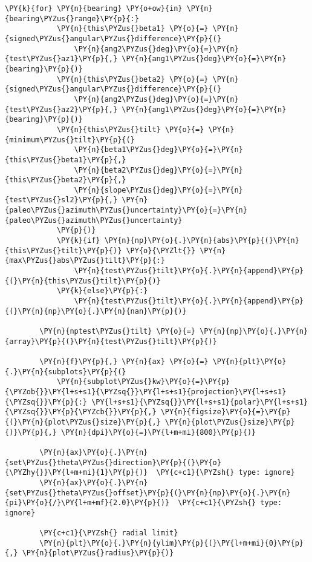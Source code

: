 \begin{tcolorbox}[breakable, size=fbox, boxrule=1pt, pad at break*=1mm,colback=cellbackground, colframe=cellborder]
\begin{Verbatim}[commandchars=\\\{\}]
        \PY{k}{for} \PY{n}{bearing} \PY{o+ow}{in} \PY{n}{bearing\PYZus{}range}\PY{p}{:}
            \PY{n}{this\PYZus{}beta1} \PY{o}{=} \PY{n}{signed\PYZus{}angular\PYZus{}difference}\PY{p}{(}
                \PY{n}{ang2\PYZus{}deg}\PY{o}{=}\PY{n}{test\PYZus{}az1}\PY{p}{,} \PY{n}{ang1\PYZus{}deg}\PY{o}{=}\PY{n}{bearing}\PY{p}{)}
            \PY{n}{this\PYZus{}beta2} \PY{o}{=} \PY{n}{signed\PYZus{}angular\PYZus{}difference}\PY{p}{(}
                \PY{n}{ang2\PYZus{}deg}\PY{o}{=}\PY{n}{test\PYZus{}az2}\PY{p}{,} \PY{n}{ang1\PYZus{}deg}\PY{o}{=}\PY{n}{bearing}\PY{p}{)}
            \PY{n}{this\PYZus{}tilt} \PY{o}{=} \PY{n}{minimum\PYZus{}tilt}\PY{p}{(}
                \PY{n}{beta1\PYZus{}deg}\PY{o}{=}\PY{n}{this\PYZus{}beta1}\PY{p}{,}
                \PY{n}{beta2\PYZus{}deg}\PY{o}{=}\PY{n}{this\PYZus{}beta2}\PY{p}{,}
                \PY{n}{slope\PYZus{}deg}\PY{o}{=}\PY{n}{test\PYZus{}sl2}\PY{p}{,} \PY{n}{paleo\PYZus{}azimuth\PYZus{}uncertainty}\PY{o}{=}\PY{n}{paleo\PYZus{}azimuth\PYZus{}uncertainty}
            \PY{p}{)}
            \PY{k}{if} \PY{n}{np}\PY{o}{.}\PY{n}{abs}\PY{p}{(}\PY{n}{this\PYZus{}tilt}\PY{p}{)} \PY{o}{\PYZlt{}} \PY{n}{max\PYZus{}abs\PYZus{}tilt}\PY{p}{:}
                \PY{n}{test\PYZus{}tilt}\PY{o}{.}\PY{n}{append}\PY{p}{(}\PY{n}{this\PYZus{}tilt}\PY{p}{)}
            \PY{k}{else}\PY{p}{:}
                \PY{n}{test\PYZus{}tilt}\PY{o}{.}\PY{n}{append}\PY{p}{(}\PY{n}{np}\PY{o}{.}\PY{n}{nan}\PY{p}{)}
    
        \PY{n}{nptest\PYZus{}tilt} \PY{o}{=} \PY{n}{np}\PY{o}{.}\PY{n}{array}\PY{p}{(}\PY{n}{test\PYZus{}tilt}\PY{p}{)}
    
        \PY{n}{f}\PY{p}{,} \PY{n}{ax} \PY{o}{=} \PY{n}{plt}\PY{o}{.}\PY{n}{subplots}\PY{p}{(}
            \PY{n}{subplot\PYZus{}kw}\PY{o}{=}\PY{p}{\PYZob{}}\PY{l+s+s1}{\PYZsq{}}\PY{l+s+s1}{projection}\PY{l+s+s1}{\PYZsq{}}\PY{p}{:} \PY{l+s+s1}{\PYZsq{}}\PY{l+s+s1}{polar}\PY{l+s+s1}{\PYZsq{}}\PY{p}{\PYZcb{}}\PY{p}{,} \PY{n}{figsize}\PY{o}{=}\PY{p}{(}\PY{n}{plot\PYZus{}size}\PY{p}{,} \PY{n}{plot\PYZus{}size}\PY{p}{)}\PY{p}{,} \PY{n}{dpi}\PY{o}{=}\PY{l+m+mi}{800}\PY{p}{)}
    
        \PY{n}{ax}\PY{o}{.}\PY{n}{set\PYZus{}theta\PYZus{}direction}\PY{p}{(}\PY{o}{\PYZhy{}}\PY{l+m+mi}{1}\PY{p}{)}  \PY{c+c1}{\PYZsh{} type: ignore}
        \PY{n}{ax}\PY{o}{.}\PY{n}{set\PYZus{}theta\PYZus{}offset}\PY{p}{(}\PY{n}{np}\PY{o}{.}\PY{n}{pi}\PY{o}{/}\PY{l+m+mf}{2.0}\PY{p}{)}  \PY{c+c1}{\PYZsh{} type: ignore}
    
        \PY{c+c1}{\PYZsh{} radial limit}
        \PY{n}{plt}\PY{o}{.}\PY{n}{ylim}\PY{p}{(}\PY{l+m+mi}{0}\PY{p}{,} \PY{n}{plot\PYZus{}radius}\PY{p}{)}
    

\end{Verbatim}
\end{tcolorbox}
